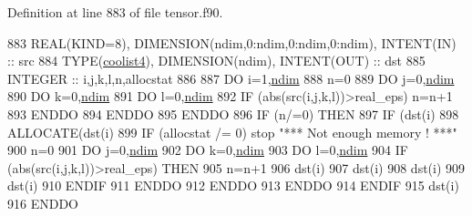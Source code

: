 Definition at line 883 of file tensor.\+f90.


\begin{DoxyCode}
883     \textcolor{keywordtype}{REAL(KIND=8)}, \textcolor{keywordtype}{DIMENSION(ndim,0:ndim,0:ndim,0:ndim)}, \textcolor{keywordtype}{INTENT(IN)} :: src
884     \textcolor{keywordtype}{TYPE}(\hyperlink{structtensor_1_1coolist4}{coolist4}), \textcolor{keywordtype}{DIMENSION(ndim)}, \textcolor{keywordtype}{INTENT(OUT)} :: dst
885     \textcolor{keywordtype}{INTEGER} :: i,j,k,l,n,allocstat
886     
887     \textcolor{keywordflow}{DO} i=1,\hyperlink{namespaceparams_a2323fe1773f086e20c14f266351c482b}{ndim}
888        n=0
889        \textcolor{keywordflow}{DO} j=0,\hyperlink{namespaceparams_a2323fe1773f086e20c14f266351c482b}{ndim}
890           \textcolor{keywordflow}{DO} k=0,\hyperlink{namespaceparams_a2323fe1773f086e20c14f266351c482b}{ndim}
891              \textcolor{keywordflow}{DO} l=0,\hyperlink{namespaceparams_a2323fe1773f086e20c14f266351c482b}{ndim}
892                 \textcolor{keywordflow}{IF} (abs(src(i,j,k,l))>real\_eps) n=n+1
893 \textcolor{keywordflow}{             ENDDO}
894 \textcolor{keywordflow}{          ENDDO}
895 \textcolor{keywordflow}{       ENDDO}
896        \textcolor{keywordflow}{IF} (n/=0) \textcolor{keywordflow}{THEN}
897           \textcolor{keywordflow}{IF} (dst(i)%
898           \textcolor{keyword}{ALLOCATE}(dst(i)%
899           \textcolor{keywordflow}{IF} (allocstat /= 0) stop \textcolor{stringliteral}{"*** Not enough memory ! ***"}
900           n=0
901           \textcolor{keywordflow}{DO} j=0,\hyperlink{namespaceparams_a2323fe1773f086e20c14f266351c482b}{ndim}
902              \textcolor{keywordflow}{DO} k=0,\hyperlink{namespaceparams_a2323fe1773f086e20c14f266351c482b}{ndim}
903                 \textcolor{keywordflow}{DO} l=0,\hyperlink{namespaceparams_a2323fe1773f086e20c14f266351c482b}{ndim}
904                    \textcolor{keywordflow}{IF} (abs(src(i,j,k,l))>real\_eps) \textcolor{keywordflow}{THEN}
905                       n=n+1
906                       dst(i)%
907                       dst(i)%
908                       dst(i)%
909                       dst(i)%
910 \textcolor{keywordflow}{                   ENDIF}
911 \textcolor{keywordflow}{                ENDDO}
912 \textcolor{keywordflow}{             ENDDO}
913 \textcolor{keywordflow}{          ENDDO}
914 \textcolor{keywordflow}{       ENDIF}
915        dst(i)%
916 \textcolor{keywordflow}{    ENDDO}
\end{DoxyCode}
